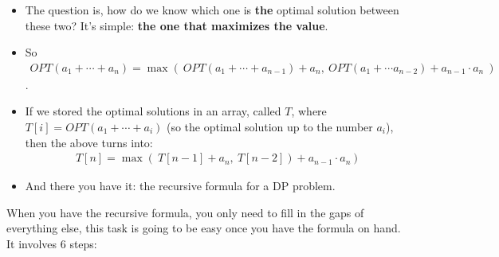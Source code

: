 \begin{itemize}
    \item The question is, how do we know which one is \textbf{the} optimal solution between these two? It's simple: \textbf{the one that maximizes the value}.
    \item So \begin{align*}OPT(a_1 + \cdots{} + a_n) = \max(~OPT(a_1 + \cdots{} + a_{n-1}) + a_n,~ OPT(a_1 + \cdots{} a_{n-2}) + a_{n-1} \cdot{} a_n~)\end{align*}.
    \item If we stored the optimal solutions in an array, called $T$, where $T[i] = OPT(a_1 + \cdots{} + a_i)$ (so the optimal solution up to the number $a_i$), then the above turns into: \begin{align*}T[n] = \max(~T[n-1] + a_n,~ T[n-2]) + a_{n-1} \cdot{} a_n~)\end{align*}
    \item And there you have it: the recursive formula for a DP problem.
\end{itemize}

When you have the recursive formula, you only need to fill in the gaps of everything else, this task is going to be easy once you have the formula on hand. It involves $6$ steps:

